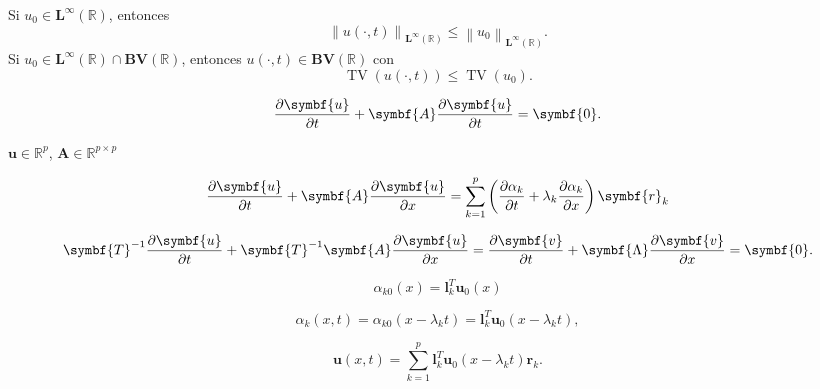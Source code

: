 \begin{theorem}
	Si $u_{0}\in\symbf{L}^{\infty}\left(\mathbb{R}\right)$, entonces
	\begin{equation*}
		{\left\|
			u\left(\cdot, t\right)
			\right\|}_{\symbf{L}^{\infty}\left(\mathbb{R}\right)}
		\leq
		{\left\|u_{0}\right\|}_{\symbf{L}^{\infty}\left(\mathbb{R}\right)}.
	\end{equation*}
	Si $u_{0}\in\symbf{L}^{\infty}\left(\mathbb{R}\right)\cap\symbf{BV}\left(\mathbb{R}\right)$,
	entonces $u\left(\cdot, t\right)\in\symbf{BV}\left(\mathbb{R}\right)$ con
	\begin{equation*}
		\operatorname{TV}\left(u\left(\cdot, t\right)\right)\leq
		\operatorname{TV}\left(u_{0}\right).
	\end{equation*}
\end{theorem}

\begin{equation*}
	\diffp{\symbf{u}}{t}+
	\symbf{A}
	\diffp{\symbf{u}}{t}=
	\symbf{0}.
\end{equation*}

$\symbf{u}\in\mathbb{R}^{p}$, $\symbf{A}\in\mathbb{R}^{p\times p}$


\begin{equation*}
	\diffp{\symbf{u}}{t}+
	\symbf{A}
	\diffp{\symbf{u}}{x}=
	\sum_{k=1}^{p}
	\left(
	\diffp{\alpha_{k}}{t}+
	\lambda_{k}
	\diffp{\alpha_{k}}{x}
	\right)
	\symbf{r}_{k}
\end{equation*}

\begin{equation*}
	\symbf{T}^{-1}
	\diffp{\symbf{u}}{t}+
	\symbf{T}^{-1}
	\symbf{A}
	\diffp{\symbf{u}}{x}=
	\diffp{\symbf{v}}{t}+
	\symbf{\Lambda}\diffp{\symbf{v}}{x}=
	\symbf{0}.
\end{equation*}


\begin{equation*}
	\alpha_{k0}\left(x\right)=
	\symbf{l}^{T}_{k}
	\symbf{u}_{0}\left(x\right)
\end{equation*}

\begin{equation*}
	\alpha_{k}\left(x,t\right)=
	\alpha_{k0}\left(x-\lambda_{k}t\right)=
	\symbf{l}^{T}_{k}\symbf{u}_{0}\left(x-\lambda_{k}t\right),
\end{equation*}

\begin{equation*}
	\symbf{u}\left(x,t\right)=
	\sum_{k=1}^{p}
	\symbf{l}^{T}_{k}
	\symbf{u}_{0}\left(x-\lambda_{k}t\right)
	\symbf{r}_{k}.
\end{equation*}

